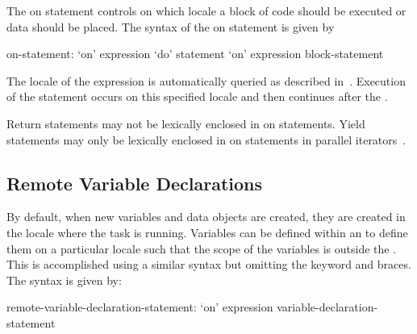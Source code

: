 The on statement controls on which locale a block of code should be
executed or data should be placed.  The syntax of the on statement is
given by
\begin{syntax}
on-statement:
  `on' expression `do' statement
  `on' expression block-statement
\end{syntax}
The locale of the expression is automatically queried as described
in~.  Execution of the
statement occurs on this specified locale and then continues after
the .

Return statements may not be lexically enclosed in on statements.
Yield statements may only be lexically enclosed in on statements in
parallel iterators~.

\subsection{Remote Variable Declarations}
\label{remote_variable_declarations}

By default, when new variables and data objects are created, they are
created in the locale where the task is running.  Variables can be
defined within an  to define them on a particular
locale such that the scope of the variables is outside
the .  This is accomplished using a similar syntax
but omitting the  keyword and braces.  The syntax is given
by:
\begin{syntax}
remote-variable-declaration-statement:
  `on' expression variable-declaration-statement
\end{syntax}
